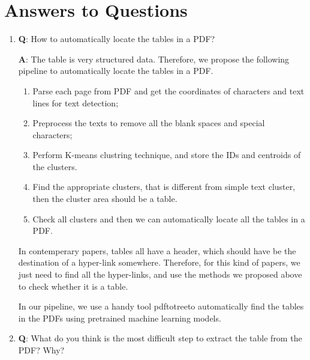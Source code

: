 \documentclass[12pt, a4paper]{article}
\theoremstyle{definition}
\begin{document}

\section{Answers to Questions}

\begin{enumerate}
	\item \textbf{Q}: How to automatically locate the tables in a PDF?
	
	\textbf{A}: The table is very structured data. Therefore, we propose the following pipeline to automatically locate the tables in a PDF.
	\begin{enumerate}
		\item Parse each page from PDF and get the coordinates of characters and text lines for text detection;
		\item Preprocess the texts to remove all the blank spaces and special characters;
		\item Perform K-means clustring technique, and store the IDs and centroids of the clusters.
		\item Find the appropriate clusters, that is different from simple text cluster, then the cluster area should be a table.
		\item Check all clusters and then we can automatically locate all the tables in a PDF.
	\end{enumerate}

	In contemperary papers, tables all have a header, which should have be the destination of a hyper-link somewhere. Therefore, for this kind of papers, we just need to find all the hyper-links, and use the methods we proposed above to check whether it is a table.

	In our pipeline, we use a handy tool pdftotree\footnotemark[1] to automatically find the tables in the PDFs using pretrained machine learning models.

	\item \textbf{Q}: What do you think is the most difficult step to extract the table from the PDF? Why?
	

\end{enumerate}
\end{document}
